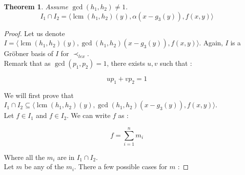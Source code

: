 \documentclass{article}
\newtheorem{theorem}{Theorem}[section]
\DeclareMathOperator{\lcm}{lcm}
\begin{document}
\begin{flushleft}
\begin{theorem} \label{th:inter-2-gcd-neq-1}
    Assume $\gcd(h_{1}, h_{2}) \neq 1$. 
    \begin{displaymath}
        I_{1} \cap I_{2} = \langle \lcm(h_{1}, h_{2})(y), \alpha (x - g_{3}(y)), f(x,y) \rangle
    \end{displaymath}
\end{theorem}

\begin{proof}
    Let us denote $I = \langle \lcm(h_{1}, h_{2})(y), \gcd(h_{1},h_{2})(x - g_{3}(y)), f(x,y) \rangle$. Again, $I$ is a Gröbner basis of $I$ for $\prec_{lex}$. \\
    Remark that as $\gcd(p_{1}, p_{2}) = 1$, there exists $u, v$ such that : 

    \begin{displaymath}
        up_{1} + vp_{2} = 1
    \end{displaymath}

    We will first prove that $I_{1} \cap I_{2} \subseteq \langle \lcm(h_{1}, h_{2})(y), \gcd(h_{1},h_{2})(x - g_{3}(y)), f(x,y) \rangle$. \\
    Let $f \in I_{1}$ and $f \in I_{2}$. We can write $f$ as : 

    \begin{displaymath}
        f = \sum_{i = 1}^{n} m_{i}
    \end{displaymath}
    
    Where all the $m_{i}$ are in $I_{1} \cap I_{2}$. \\
    Let $m$ be any of the $m_{i}$. There a few possible cases for $m$ : 
    

\end{proof}
\end{flushleft}
\end{document}
